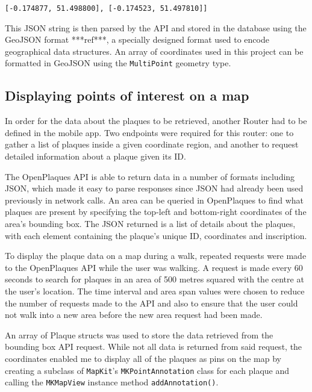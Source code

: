 \begin{center}
  \verb|[-0.174877, 51.498800], [-0.174523, 51.497810]]|
\end{center}

This JSON string is then parsed by the API and stored in the database using the GeoJSON format ***ref***, a specially designed format used to encode geographical data structures. An array of coordinates used in this project can be formatted in GeoJSON using the \verb|MultiPoint| geometry type.

\subsection{Displaying points of interest on a map}

In order for the data about the plaques to be retrieved, another Router had to be defined in the mobile app. Two endpoints were required for this router: one to gather a list of plaques inside a given coordinate region, and another to request detailed information about a plaque given its ID.

The OpenPlaques API is able to return data in a number of formats including JSON, which made it easy to parse responses since JSON had already been used previously in network calls. An area can be queried in OpenPlaques to find what plaques are present by specifying the top-left and bottom-right coordinates of the area's bounding box. The JSON returned is a list of details about the plaques, with each element containing the plaque's unique ID, coordinates and inscription.


To display the plaque data on a map during a walk, repeated requests were made to the OpenPlaques API while the user was walking. A request is made every 60 seconds to search for plaques in an area of 500 metres squared with the centre at the user's location. The time interval and area span values were chosen to reduce the number of requests made to the API and also to ensure that the user could not walk into a new area before the new area request had been made.

An array of Plaque structs was used to store the data retrieved from the bounding box API request. While not all data is returned from said request, the coordinates enabled me to display all of the plaques as pins on the map by creating a subclass of \verb|MapKit|'s \verb|MKPointAnnotation| class for each plaque and calling the \verb|MKMapView| instance method \verb|addAnnotation()|.

